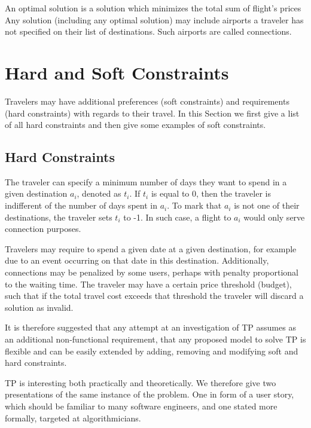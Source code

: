 \documentclass{article}
\theoremstyle{definition}
\begin{document}
An optimal solution is a solution which minimizes the total sum of flight's prices%
Any solution (including any optimal solution) may include airports a traveler has not specified on their list of destinations. Such airports are called connections.

\section{Hard and Soft Constraints}

Travelers may have additional preferences (soft constraints) and requirements (hard constraints) with regards to their travel. In this Section we first give a list of all hard constraints and then give some examples of soft constraints.

\subsection{Hard Constraints}
The traveler can specify a minimum number of days they want to spend in a given destination $a_{i}$, denoted as $t_{i}$. If $t_{i}$ is equal to 0, then the traveler is indifferent of the number of days spent in $a_{i}$. To mark that $a_{i}$ is not one of their destinations, the traveler sets $t_{i}$ to -1. In such case, a flight to $a_{i}$ would only serve connection purposes. 

Travelers may require to spend a given date at a given destination, for example due to an event occurring on that date in this destination. Additionally, connections may be penalized by some users, perhaps with penalty proportional to the waiting time. The traveler may have a certain price threshold (budget), such that if the total travel cost exceeds that threshold the traveler will discard a solution as invalid.

It is therefore suggested that any attempt at an investigation of TP assumes as an additional non-functional requirement, that any proposed model to solve TP is flexible and can be easily extended by adding, removing and modifying soft and hard constraints.

TP is interesting both practically and theoretically. We therefore give two presentations of the same instance of the problem. One in form of a user story, which should be familiar to many software engineers, and one stated more formally, targeted at algorithmicians.
\end{document}
